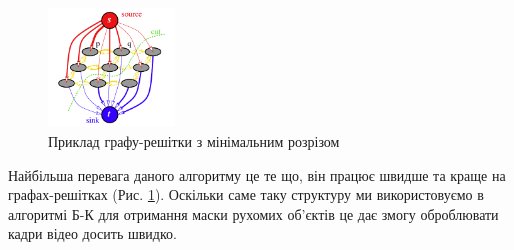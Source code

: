 \begin{figure}[h]
    \centering
    \includegraphics[width=0.3\textwidth]{images/graph_cut}
    \caption{Приклад графу-решітки з мінімальним розрізом
        \label{fig:graph_lattice}
    }
\end{figure}

Найбільша перевага даного алгоритму це те що, він працює швидше та краще на графах-решітках
(Рис. \ref{fig:graph_lattice}).
Оскільки саме таку структуру ми використовуємо в алгоритмі Б-К для отримання маски рухомих
об'єктів це дає змогу оброблювати кадри відео досить швидко.
